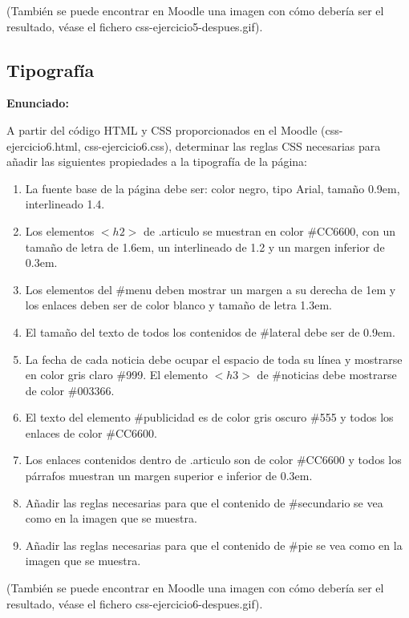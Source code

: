 (También se puede encontrar en Moodle una imagen con cómo debería ser el resultado, 
véase el fichero css-ejercicio5-despues.gif).

\subsection{Tipografía}
\label{subsec:tipografia}

\textbf{Enunciado:}

A partir del código HTML y CSS proporcionados en el Moodle (css-ejercicio6.html, css-ejercicio6.css), determinar las reglas CSS necesarias para añadir las siguientes propiedades a la tipografía de la página:

\begin{enumerate}
  \item La fuente base de la página debe ser: color negro, tipo Arial, tamaño 0.9em, interlineado 1.4.
  \item Los elementos $<h2>$ de .articulo se muestran en color \#CC6600, con un tamaño de letra de 1.6em, un interlineado de 1.2 y un margen inferior de 0.3em.
  \item Los elementos del \#menu deben mostrar un margen a su derecha de 1em y los enlaces deben ser de color blanco y tamaño de letra 1.3em.
  \item El tamaño del texto de todos los contenidos de \#lateral debe ser de 0.9em.   
\item La fecha de cada noticia debe ocupar el espacio de toda su línea y mostrarse en color gris claro \#999. El elemento $<h3>$ de \#noticias debe mostrarse de color \#003366.
  \item El texto del elemento \#publicidad es de color gris oscuro \#555 y todos los enlaces de color \#CC6600.
  \item Los enlaces contenidos dentro de .articulo son de color \#CC6600 y todos los párrafos muestran un margen superior e inferior de 0.3em.
  \item Añadir las reglas necesarias para que el contenido de \#secundario se vea como en la imagen que se muestra.
  \item Añadir las reglas necesarias para que el contenido de \#pie se vea como en la imagen que se muestra.
\end{enumerate}

(También se puede encontrar en Moodle una imagen con cómo debería ser el resultado, 
véase el fichero css-ejercicio6-despues.gif).

